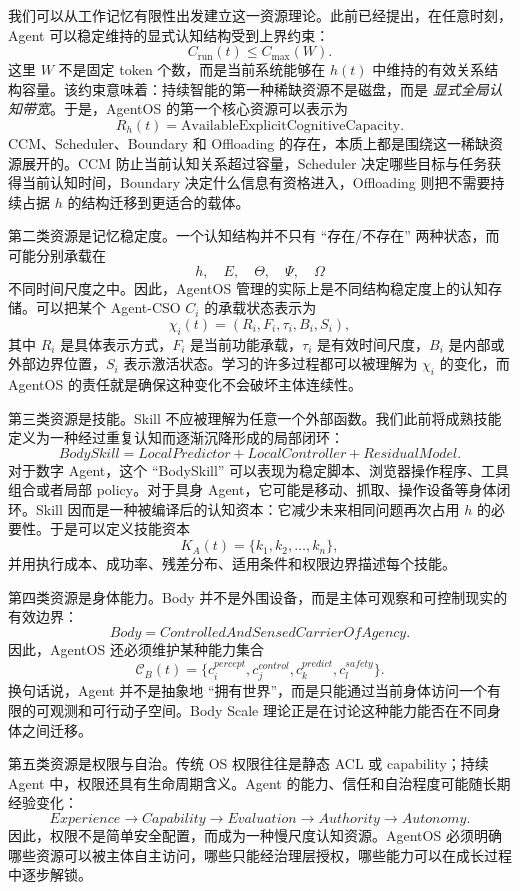 我们可以从工作记忆有限性出发建立这一资源理论。此前已经提出，在任意时刻，Agent 可以稳定维持的显式认知结构受到上界约束：
\[
C_{\mathrm{run}}(t)\leq C_{\max}(W).
\]
这里 $W$ 不是固定 token 个数，而是当前系统能够在 $h(t)$ 中维持的有效关系结构容量。该约束意味着：持续智能的第一种稀缺资源不是磁盘，而是 \emph{显式全局认知带宽}。于是，AgentOS 的第一个核心资源可以表示为
\[
R_h(t)=\text{AvailableExplicitCognitiveCapacity}.
\]
CCM、Scheduler、Boundary 和 Offloading 的存在，本质上都是围绕这一稀缺资源展开的。CCM 防止当前认知关系超过容量，Scheduler 决定哪些目标与任务获得当前认知时间，Boundary 决定什么信息有资格进入，Offloading 则把不需要持续占据 $h$ 的结构迁移到更适合的载体。

第二类资源是记忆稳定度。一个认知结构并不只有 ``存在/不存在'' 两种状态，而可能分别承载在
\[
h,\quad E,\quad \Theta,\quad \Psi,\quad \Omega
\]
不同时间尺度之中。因此，AgentOS 管理的实际上是不同结构稳定度上的认知存储。可以把某个 Agent-CSO $C_i$ 的承载状态表示为
\[
\chi_i(t)
=
(R_i,F_i,\tau_i,B_i,S_i),
\]
其中 $R_i$ 是具体表示方式，$F_i$ 是当前功能承载，$\tau_i$ 是有效时间尺度，$B_i$ 是内部或外部边界位置，$S_i$ 表示激活状态。学习的许多过程都可以被理解为 $\chi_i$ 的变化，而 AgentOS 的责任就是确保这种变化不会破坏主体连续性。

第三类资源是技能。Skill 不应被理解为任意一个外部函数。我们此前将成熟技能定义为一种经过重复认知而逐渐沉降形成的局部闭环：
\[
\boxed{
BodySkill
=
LocalPredictor
+
LocalController
+
ResidualModel.
}
\]
对于数字 Agent，这个 ``BodySkill'' 可以表现为稳定脚本、浏览器操作程序、工具组合或者局部 policy。对于具身 Agent，它可能是移动、抓取、操作设备等身体闭环。Skill 因而是一种被编译后的认知资本：它减少未来相同问题再次占用 $h$ 的必要性。于是可以定义技能资本
\[
K_A(t)=\{k_1,k_2,\ldots,k_n\},
\]
并用执行成本、成功率、残差分布、适用条件和权限边界描述每个技能。

第四类资源是身体能力。Body 并不是外围设备，而是主体可观察和可控制现实的有效边界：
\[
\boxed{
Body
=
ControlledAndSensedCarrierOfAgency.
}
\]
因此，AgentOS 还必须维护某种能力集合
\[
\mathcal C_B(t)
=
\{
c^{percept}_i,
c^{control}_j,
c^{predict}_k,
c^{safety}_l
\}.
\]
换句话说，Agent 并不是抽象地 ``拥有世界''，而是只能通过当前身体访问一个有限的可观测和可行动子空间。Body Scale 理论正是在讨论这种能力能否在不同身体之间迁移。

第五类资源是权限与自治。传统 OS 权限往往是静态 ACL 或 capability；持续 Agent 中，权限还具有生命周期含义。Agent 的能力、信任和自治程度可能随长期经验变化：
\[
Experience
\rightarrow
Capability
\rightarrow
Evaluation
\rightarrow
Authority
\rightarrow
Autonomy.
\]
因此，权限不是简单安全配置，而成为一种慢尺度认知资源。AgentOS 必须明确哪些资源可以被主体自主访问，哪些只能经治理层授权，哪些能力可以在成长过程中逐步解锁。

